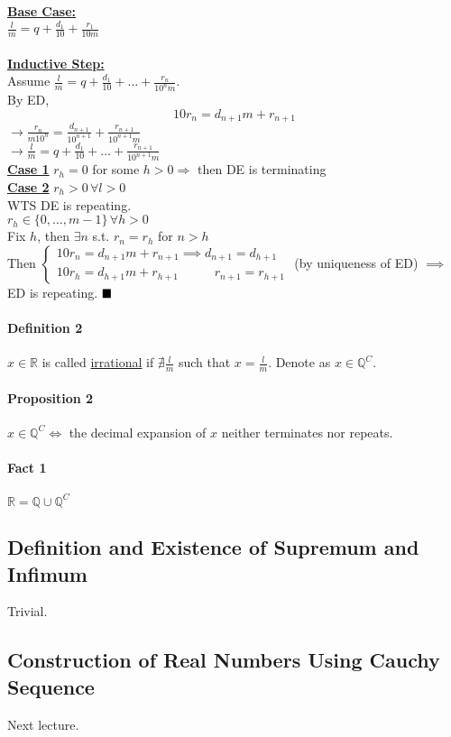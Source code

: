 \documentclass[11pt]{article}
\newcommand{\real}[0]{\mathbb{R}}
\newcommand{\under}[1]{\underline{#1}}
\newcommand{\rational}[0]{\mathbb{Q}}
\newcommand{\qed}[0]{$\hfill\blacksquare$}
\begin{document}
\textbf{\under{Base Case:}} \\
$\frac{l}{m} = q + \frac{d_1}{10} + \frac{r_1}{10m}$ \\\\
\textbf{\under{Inductive Step:}} \\
Assume $\frac{l}{m} = q + \frac{d_1}{10} + \hdots + \frac{r_n}{10^nm}$. \\
By ED, $$10r_n = d_{n+1} m + r_{n+1}$$
$\rightarrow \frac{r_n}{m10^n} = \frac{d_{n+1}}{10^{n+1}} + \frac{r_{n+1}}{10^{n+1}m}$ \\
$\rightarrow \frac{l}{m} = q + \frac{d_1}{10} + \hdots + \frac{r_{n+1}}{10^{n+1}m}$ \\
\textbf{\under{Case 1}} $r_h = 0$ for some $h > 0 \Rightarrow$ then DE is terminating \\
\textbf{\under{Case 2}} $r_h > 0 \, \forall l > 0$ \\
WTS DE is repeating. \\
$r_h \in \{0, \hdots, m-1\} \, \forall h > 0$ \\
Fix $h$, then $\exists n$ s.t. $r_n = r_h$ for $n > h$ \\
Then
$\begin{cases}
	10 r_n = d_{n+1}m + r_{n+1} \implies d_{n+1} = d_{h+1}\\
	10 r_h = d_{h+1}m + r_{h+1} \quad\quad\,\,\,\,\, r_{n+1} = r_{h+1}
\end{cases}$
(by uniqueness of ED)
$\implies$ ED is repeating. \qed
\paragraph{Definition 2} $x \in \real$ is called \under{irrational} if $\nexists \frac{l}{m}$ such that $x = \frac{l}{m}$. Denote as $x \in \rational^C$.
\paragraph{Proposition 2} $x \in \rational^C \iff$ the decimal expansion of $x$ neither terminates nor repeats.
\paragraph{Fact 1} $\real = \rational \cup \rational^C$
\subsection{Definition and Existence of Supremum and Infimum}
Trivial.
\subsection{Construction of Real Numbers Using Cauchy Sequence}
Next lecture.
\end{document}
